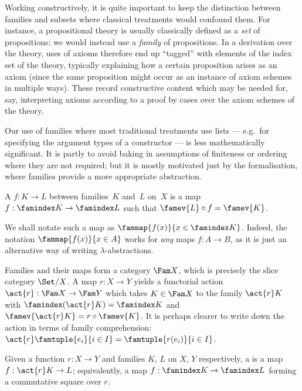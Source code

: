 Working constructively, it is quite important to keep the distinction between families and subsets where classical treatments would confound them.
%
For instance, a propositional theory is usually classically defined as a \emph{set} of propositions; we would instead use a \emph{family} of propositions.
%
In a derivation over the theory, uses of axioms therefore end up “tagged” with elements of the index set of the theory, typically explaining how a certain proposition arises as an axiom (since the same proposition might occur as an instance of axiom schemes in multiple ways).
%
These record constructive content which may be needed for, say, interpreting axioms according to a proof by cases over the axiom schemes of the theory.

Our use of families where most traditional treatments use lists --- e.g.\ for specifying the argument types of a constructor --- is less mathematically significant.
%
It is partly to avoid baking in assumptions of finiteness or ordering where they are not required; but it is mostly motivated just by the formalisation, where families provide a more appropriate abstraction.


\begin{definition}
  \label{def:family-map}%
  A  $f : K \to L$ between families~$K$ and~$L$ on~$X$ is a map
  $f : \famindex K \to \famindex L$ such that $\famev{L} \circ f = \famev{K}$.
\end{definition}

We shall notate such a map as $\fammap{f(x)}{x \in \famindex K}$. Indeed, the notation $\fammap{f(x)}{x \in A}$ works for \emph{any} maps $f : A \to B$, as it is just an alternative way of writing $\lambda$-abstractions.

Families and their maps form a category $\Fam X$, which is precisely the slice category $\Set/X$.
%
A map $r : X \to Y$ yields a functorial action $\act{r} : \Fam X \to \Fam Y$ which takes $K \in \Fam X$ to the family $\act{r} K$ with $\famindex (\act{r} K) = \famindex K$ and $\famev{\act{r} K} = r \circ \famev{K}$. It is perhaps clearer to write down the action in terms of family comprehension: $\act{r} \famtuple{e_i}{i \in I} = \famtuple{r(e_i)}{i \in I}$.

\begin{definition}
  \label{def:family-map-over}%
  Given a function $r : X \to Y$ and families $K$, $L$ on $X$, $Y$ respectively, a  is a map $f : \act{r} K \to L$; equivalently, a map $f : \famindex K \to \famindex L$ forming a commutative square over $r$.
\end{definition}


